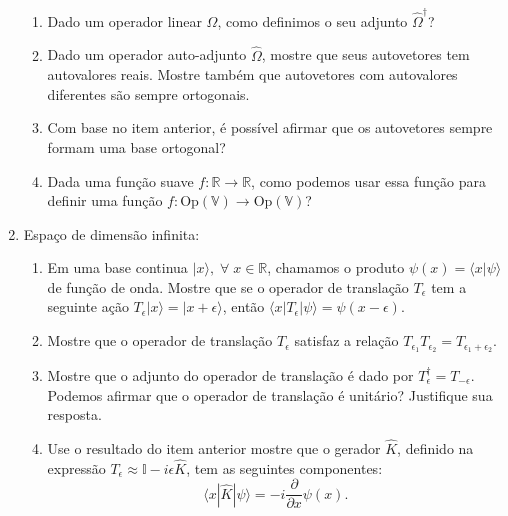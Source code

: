 \begin{enumerate}
	      \begin{enumerate}
		      \item Dado um operador linear $\hat{\Omega}$, como definimos o seu adjunto
		            $\hat{\Omega}^\dagger$?
		      \item Dado um operador auto-adjunto $\hat{\Omega}$, mostre que seus autovetores tem
		            autovalores reais. Mostre também que autovetores com autovalores diferentes
		            são sempre ortogonais.
		      \item Com base no item anterior, é possível afirmar que os autovetores
		            sempre formam uma base ortogonal?
		      \item Dada uma função suave $f:\mathbb{R}\to\mathbb{R}$, como podemos usar
		            essa função para definir uma função
		            $f:\mathrm{Op}\left(\mathbb{V}\right)\to\mathrm{Op}\left(\mathbb{V}\right)$?
	      \end{enumerate}
	\item Espaço de dimensão infinita:
	      \begin{enumerate}
		      \item Em uma base continua $|x\rangle,\;\forall\;x\in\mathbb{R}$, chamamos
		            o produto $\psi(x) = \langle x|\psi\rangle$ de função de onda.
		            Mostre que se o operador de translação $T_\epsilon$ tem a seguinte
		            ação $T_\epsilon|x\rangle = |x+\epsilon\rangle$, então $\langle
			            x|T_\epsilon|\psi\rangle = \psi(x-\epsilon)$.
		      \item Mostre que o operador de translação $T_\epsilon$ satisfaz a relação
		            $T_{\epsilon_1}T_{\epsilon_2} = T_{\epsilon_1+\epsilon_2}$.
		      \item Mostre que o adjunto do operador de translação é dado por
		            $T_\epsilon^\dagger = T_{-\epsilon}$. Podemos afirmar que o operador
		            de translação é unitário? Justifique sua resposta.
		      \item Use o resultado do item anterior mostre que o gerador $\hat{K}$,
		            definido na expressão $T_\epsilon \approx \mathbb{I} - i \epsilon
			            \hat{K}$, tem as seguintes componentes: $$\langle
			            x|\hat{K}|\psi\rangle = -i\frac{\partial}{\partial x}\psi(x).$$
	      \end{enumerate}
\end{enumerate}


